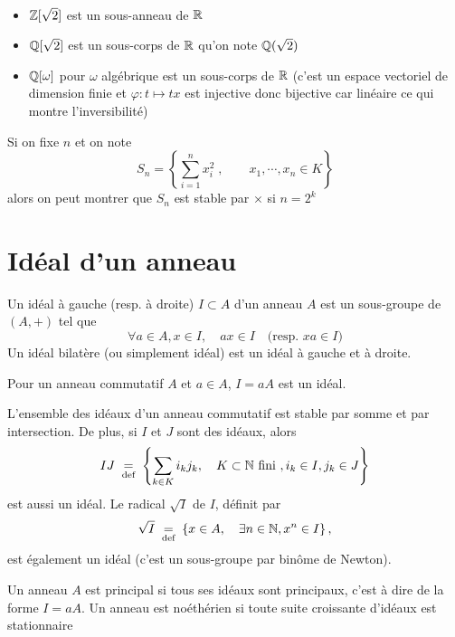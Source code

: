 \begin{ex}~
    \begin{itemize}
        \item $\mathbb Z[\sqrt 2]$ est un sous-anneau de $\mathbb R$
        \item $\mathbb Q[\sqrt 2]$ est un sous-corps de $\mathbb R$ qu'on note $\mathbb Q(\sqrt 2)$
        \item $\mathbb Q[\omega]$ pour $\omega$ algébrique est un sous-corps de $\mathbb R$ (c'est un espace vectoriel de dimension finie et $\varphi: t\longmapsto tx$ est injective donc bijective car linéaire ce qui montre l'inversibilité)
    \end{itemize}
\end{ex}

\begin{rem}
    Si on fixe $n$ et on note \[
        S_n=\left\{\sum_{i=1}^nx_i^2\;, \qquad x_1, \cdots, x_n\in K\right\}
    \]
    alors on peut montrer que $S_n$ est stable par $\times$ si $n=2^k$
\end{rem}

\section{Idéal d'un anneau}

\begin{dfn}
    Un idéal à gauche (resp. à droite) $I\subset A$ d'un anneau $A$ est un sous-groupe de $(A, +)$ tel que \[
        \forall a\in A, x\in I,\quad  ax\in I\quad \text{(resp. $xa\in I$)}
    \]
    Un idéal bilatère (ou simplement idéal) est un idéal à gauche et à droite.
\end{dfn}


\begin{rem}
    Pour un anneau commutatif $A$ et $a\in A$, $I=aA$ est un idéal.
\end{rem}

L'ensemble des idéaux d'un anneau commutatif est stable par somme et par intersection. De plus, si $I$ et $J$ sont des idéaux, alors \[
    IJ \;\underset{\text{def}}=\; \left\{ \sum_{k\in K}i_kj_k, \quad K\subset \mathbb N \text{ fini }, i_k\in I, j_k\in J \right\}
\]
est aussi un idéal. Le radical $\sqrt I$ de $I$, définit par \[
    \sqrt I \;\underset{\text{def}}=\; \left\{ x\in A, \quad \exists n\in\mathbb N, x^n\in I \right\},
\]
est également un idéal (c'est un sous-groupe par binôme de Newton).

\begin{dfn}
    Un anneau $A$ est principal si tous ses idéaux sont principaux, c'est à dire de la forme $I=aA$. Un anneau est noéthérien si toute suite croissante d'idéaux est stationnaire
\end{dfn}


